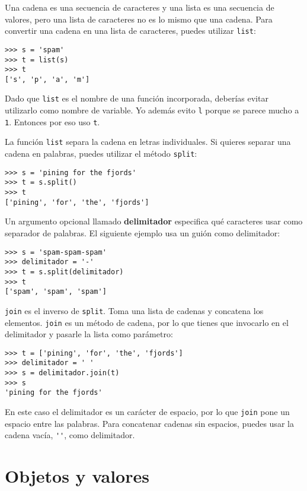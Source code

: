 \documentclass[10pt]{book}
\begin{document}
Una cadena es una secuencia de caracteres y una lista es una secuencia
de valores, pero una lista de caracteres no es lo mismo que una
cadena.  Para convertir una cadena en una lista de caracteres,
puedes utilizar {\tt list}:

\begin{verbatim}
>>> s = 'spam'
>>> t = list(s)
>>> t
['s', 'p', 'a', 'm']
\end{verbatim}
%
Dado que {\tt list} es el nombre de una función incorporada, deberías
evitar utilizarlo como nombre de variable.  Yo además evito {\tt l} porque
se parece mucho a {\tt 1}.  Entonces por eso uso {\tt t}.

La función {\tt list} separa la cadena en letras individuales.  Si
quieres separar una cadena en palabras, puedes utilizar
el método {\tt split}:

\begin{verbatim}
>>> s = 'pining for the fjords'
>>> t = s.split()
>>> t
['pining', 'for', 'the', 'fjords']
\end{verbatim}
%
Un argumento opcional llamado {\bf delimitador} especifica qué
caracteres usar como separador de palabras.
El siguiente ejemplo
usa un guión como delimitador:

\begin{verbatim}
>>> s = 'spam-spam-spam'
>>> delimitador = '-'
>>> t = s.split(delimitador)
>>> t
['spam', 'spam', 'spam']
\end{verbatim}
%
{\tt join} es el inverso de {\tt split}.
Toma una lista de cadenas y
concatena los elementos.  {\tt join} es un método de cadena,
por lo que tienes que invocarlo en el delimitador y pasarle la
lista como parámetro:

\begin{verbatim}
>>> t = ['pining', 'for', 'the', 'fjords']
>>> delimitador = ' '
>>> s = delimitador.join(t)
>>> s
'pining for the fjords'
\end{verbatim}
%
En este caso el delimitador es un carácter de espacio, por lo que
{\tt join} pone un espacio entre las palabras.  Para concatenar
cadenas sin espacios, puedes usar la cadena vacía,
\verb"''", como delimitador.


\section{Objetos y valores}
\label{equivalence}
\end{document}
